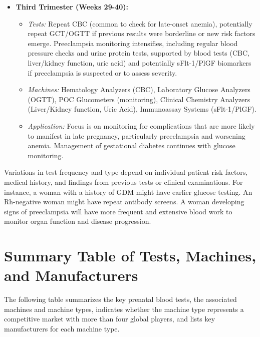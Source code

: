 \documentclass{article}
\begin{document}
\begin{itemize}
\begin{itemize}
    \item \textbf{Third Trimester (Weeks 29-40):}
    \begin{itemize}
        \item \textit{Tests:} Repeat CBC (common to check for late-onset anemia), potentially repeat GCT/OGTT if previous results were borderline or new risk factors emerge. Preeclampsia monitoring intensifies, including regular blood pressure checks and urine protein tests, supported by blood tests (CBC, liver/kidney function, uric acid) and potentially sFlt-1/PlGF biomarkers if preeclampsia is suspected or to assess severity.
        \item \textit{Machines:} Hematology Analyzers (CBC), Laboratory Glucose Analyzers (OGTT), POC Glucometers (monitoring), Clinical Chemistry Analyzers (Liver/Kidney function, Uric Acid), Immunoassay Systems (sFlt-1/PlGF).
        \item \textit{Application:} Focus is on monitoring for complications that are more likely to manifest in late pregnancy, particularly preeclampsia and worsening anemia. Management of gestational diabetes continues with glucose monitoring.
    \end{itemize}
\end{itemize}

Variations in test frequency and type depend on individual patient risk factors, medical history, and findings from previous tests or clinical examinations. For instance, a woman with a history of GDM might have earlier glucose testing. An Rh-negative woman might have repeat antibody screens. A woman developing signs of preeclampsia will have more frequent and extensive blood work to monitor organ function and disease progression.

\section{Summary Table of Tests, Machines, and Manufacturers}

The following table summarizes the key prenatal blood tests, the associated machines and machine types, indicates whether the machine type represents a competitive market with more than four global players, and lists key manufacturers for each machine type.


\end{itemize}
\end{document}
